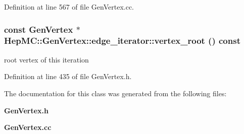 Definition at line 567 of file Gen\-Vertex.cc.
\subsubsection{\setlength{\rightskip}{0pt plus 5cm}const {\bf Gen\-Vertex} $\ast$ Hep\-MC::Gen\-Vertex::edge\_\-iterator::vertex\_\-root () const\hspace{0.3cm}{\tt  [inline]}}\label{classHepMC_1_1GenVertex_1_1edge__iterator_9ae8362b7e2c945949a08d0864df4203}


root vertex of this iteration 



Definition at line 435 of file Gen\-Vertex.h.

The documentation for this class was generated from the following files:\begin{CompactItemize}
\item 
{\bf Gen\-Vertex.h}\item 
{\bf Gen\-Vertex.cc}\end{CompactItemize}
